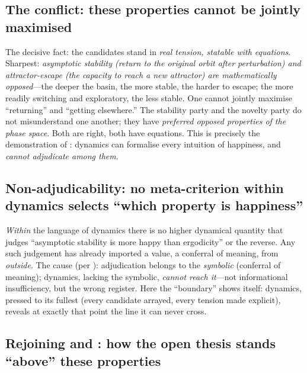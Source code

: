 \subsection{The conflict: these properties cannot be jointly maximised}
\label{p19:sub:dyn-conflict}

The decisive fact: the candidates stand in \emph{real tension, statable with equations}. Sharpest: \emph{asymptotic stability (return to the original orbit after perturbation) and attractor-escape (the capacity to reach a new attractor) are mathematically opposed}---the deeper the basin, the more stable, the harder to escape; the more readily switching and exploratory, the less stable. One cannot jointly maximise ``returning'' and ``getting elsewhere.'' The stability party and the novelty party do not misunderstand one another; they have \emph{preferred opposed properties of the phase space}. Both are right, both have equations. This is precisely the demonstration of : dynamics can formalise every intuition of happiness, and \emph{cannot adjudicate among them}.

\subsection{Non-adjudicability: no meta-criterion within dynamics selects ``which property is happiness''}
\label{p19:sub:dyn-nonadjudicate}

\emph{Within} the language of dynamics there is no higher dynamical quantity that judges ``asymptotic stability is more happy than ergodicity'' or the reverse. Any such judgement has already imported a value, a conferral of meaning, from \emph{outside}. The cause (per ): adjudication belongs to the \emph{symbolic} (conferral of meaning); dynamics, lacking the symbolic, \emph{cannot reach it}---not informational insufficiency, but the wrong register. Here the ``boundary'' shows itself: dynamics, pressed to its fullest (every candidate arrayed, every tension made explicit), reveals at exactly that point the line it can never cross.

\subsection{Rejoining  and : how the open thesis stands ``above'' these properties}
\label{p19:sub:dyn-rejoin}

